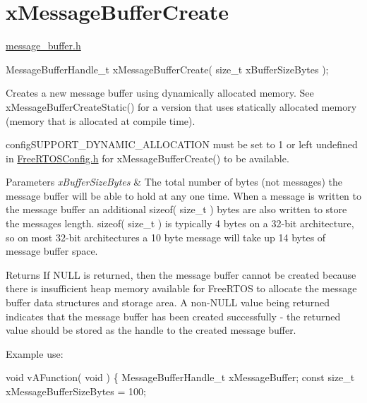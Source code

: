 \hypertarget{group__x_message_buffer_create}{}\section{x\+Message\+Buffer\+Create}
\label{group__x_message_buffer_create}
\mbox{\hyperlink{message__buffer_8h_source}{message\+\_\+buffer.\+h}}


\begin{DoxyPre}
MessageBufferHandle\_t xMessageBufferCreate( size\_t xBufferSizeBytes );
\end{DoxyPre}


Creates a new message buffer using dynamically allocated memory. See x\+Message\+Buffer\+Create\+Static() for a version that uses statically allocated memory (memory that is allocated at compile time).

config\+S\+U\+P\+P\+O\+R\+T\+\_\+\+D\+Y\+N\+A\+M\+I\+C\+\_\+\+A\+L\+L\+O\+C\+A\+T\+I\+ON must be set to 1 or left undefined in \mbox{\hyperlink{_free_r_t_o_s_config_8h_source}{Free\+R\+T\+O\+S\+Config.\+h}} for x\+Message\+Buffer\+Create() to be available.


\begin{DoxyParams}{Parameters}
{\em x\+Buffer\+Size\+Bytes} & The total number of bytes (not messages) the message buffer will be able to hold at any one time. When a message is written to the message buffer an additional sizeof( size\+\_\+t ) bytes are also written to store the message\textquotesingle{}s length. sizeof( size\+\_\+t ) is typically 4 bytes on a 32-\/bit architecture, so on most 32-\/bit architectures a 10 byte message will take up 14 bytes of message buffer space.\\
\hline
\end{DoxyParams}
\begin{DoxyReturn}{Returns}
If N\+U\+LL is returned, then the message buffer cannot be created because there is insufficient heap memory available for Free\+R\+T\+OS to allocate the message buffer data structures and storage area. A non-\/\+N\+U\+LL value being returned indicates that the message buffer has been created successfully -\/ the returned value should be stored as the handle to the created message buffer.
\end{DoxyReturn}
Example use\+: 
\begin{DoxyPre}\end{DoxyPre}



\begin{DoxyPre}void vAFunction( void )
\{
MessageBufferHandle\_t xMessageBuffer;
const size\_t xMessageBufferSizeBytes = 100;\end{DoxyPre}



